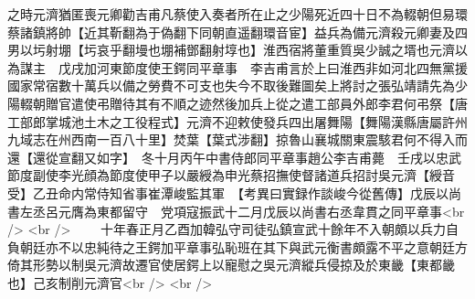之時元濟猶匿喪元卿勸吉甫凡蔡使入奏者所在止之少陽死近四十日不為輟朝但易環蔡諸鎮將帥【近其靳翻為于偽翻下同朝直遥翻環音宦】益兵為備元濟殺元卿妻及四男以圬射堋【圬哀乎翻墁也堋補鄧翻射埻也】淮西宿將董重質吳少誠之壻也元濟以為謀主　戊戌加河東節度使王鍔同平章事　李吉甫言於上曰淮西非如河北四無黨援國家常宿數十萬兵以備之勞費不可支也失今不取後難圖矣上將討之張弘靖請先為少陽輟朝贈官遣使弔贈待其有不順之迹然後加兵上從之遣工部員外郎李君何弔祭【唐工部郎掌城池土木之工役程式】元濟不迎敕使發兵四出屠舞陽【舞陽漢縣唐屬許州九域志在州西南一百八十里】焚葉【葉式涉翻】掠魯山襄城關東震駭君何不得入而還【還從宣翻又如字】　冬十月丙午中書侍郎同平章事趙公李吉甫薨　壬戌以忠武節度副使李光顔為節度使甲子以嚴綬為申光蔡招撫使督諸道兵招討吳元濟【綬音受】乙丑命内常侍知省事崔潭峻監其軍　【考異曰實録作談峻今從舊傳】戊辰以尚書左丞呂元膺為東都留守　党項寇振武十二月戊辰以尚書右丞韋貫之同平章事<br />
<br />
　　十年春正月乙酉加韓弘守司徒弘鎮宣武十餘年不入朝頗以兵力自負朝廷亦不以忠純待之王鍔加平章事弘恥班在其下與武元衡書頗露不平之意朝廷方倚其形勢以制吳元濟故遷官使居鍔上以寵慰之吳元濟縱兵侵掠及於東畿【東都畿也】己亥制削元濟官<br />
<br />

